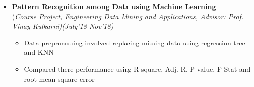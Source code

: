 \documentclass[a4paper,10pt]{article}
\begin{document}
\begin{itemize}
	\item \textbf{Pattern Recognition among Data using Machine Learning} \\ 
(\emph{Course Project, Engineering Data Mining and Applications, Advisor: Prof. Vinay Kulkarni)\hfill (July'18-Nov’18)} \\[-0.4cm]
    \vspace{-0.05cm}
	\begin{itemize}[noitemsep,nolistsep]
	\item Data preprocessing involved replacing missing data using regression tree
    and KNN 
    \item  Compared there performance using R-square, Adj. R, P-value, F-Stat and root mean square error
	\end{itemize}
	
\end{itemize}

\end{document}
